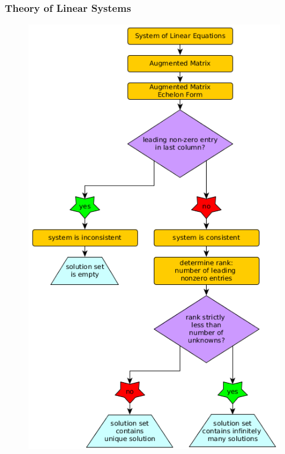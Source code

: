 \documentclass[xcolor=dvipsnames]{beamer}
\begin{document}
\begin{frame}
  \frametitle{Theory of Linear Systems}
  \begin{figure}[h]
    \includegraphics[scale=.28]{./diagrams/echelon.png}
  \end{figure}
\end{frame}
\end{document}
